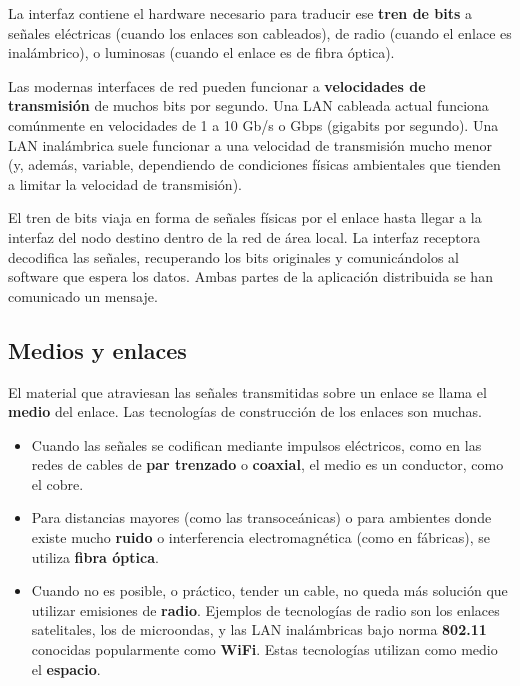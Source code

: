 \documentclass[spanish,a4paper,]{article}
\providecommand{\tightlist}{%
  \setlength{\itemsep}{0pt}\setlength{\parskip}{0pt}}
\begin{document}
La interfaz contiene el hardware necesario para traducir ese
\textbf{tren de bits} a señales eléctricas (cuando los enlaces son
cableados), de radio (cuando el enlace es inalámbrico), o luminosas
(cuando el enlace es de fibra óptica).

Las modernas interfaces de red pueden funcionar a \textbf{velocidades de
transmisión} de muchos bits por segundo. Una LAN cableada actual
funciona comúnmente en velocidades de 1 a 10 Gb/s o Gbps (gigabits por
segundo). Una LAN inalámbrica suele funcionar a una velocidad de
transmisión mucho menor (y, además, variable, dependiendo de condiciones
físicas ambientales que tienden a limitar la velocidad de transmisión).

El tren de bits viaja en forma de señales físicas por el enlace hasta
llegar a la interfaz del nodo destino dentro de la red de área local. La
interfaz receptora decodifica las señales, recuperando los bits
originales y comunicándolos al software que espera los datos. Ambas
partes de la aplicación distribuida se han comunicado un mensaje.

\hypertarget{medios-y-enlaces}{%
\subsection{Medios y enlaces}\label{medios-y-enlaces}}

El material que atraviesan las señales transmitidas sobre un enlace se
llama el \textbf{medio} del enlace. Las tecnologías de construcción de
los enlaces son muchas.

\begin{itemize}
\tightlist
\item
  Cuando las señales se codifican mediante impulsos eléctricos, como en
  las redes de cables de \textbf{par trenzado} o \textbf{coaxial}, el
  medio es un conductor, como el cobre.
\item
  Para distancias mayores (como las transoceánicas) o para ambientes
  donde existe mucho \textbf{ruido} o interferencia electromagnética
  (como en fábricas), se utiliza \textbf{fibra óptica}.
\item
  Cuando no es posible, o práctico, tender un cable, no queda más
  solución que utilizar emisiones de \textbf{radio}. Ejemplos de
  tecnologías de radio son los enlaces satelitales, los de microondas, y
  las LAN inalámbricas bajo norma \textbf{802.11} conocidas popularmente
  como \textbf{WiFi}. Estas tecnologías utilizan como medio el
  \textbf{espacio}.
\end{itemize}
\end{document}

